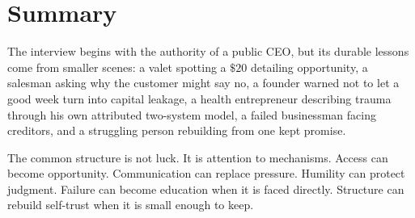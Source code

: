 \section{Summary}

The interview begins with the authority of a public CEO, but its durable lessons come from smaller scenes: a valet spotting a \(\$20\) detailing opportunity, a salesman asking why the customer might say no, a founder warned not to let a good week turn into capital leakage, a health entrepreneur describing trauma through his own attributed two-system model, a failed businessman facing creditors, and a struggling person rebuilding from one kept promise.

The common structure is not luck. It is attention to mechanisms. Access can become opportunity. Communication can replace pressure. Humility can protect judgment. Failure can become education when it is faced directly. Structure can rebuild self-trust when it is small enough to keep.